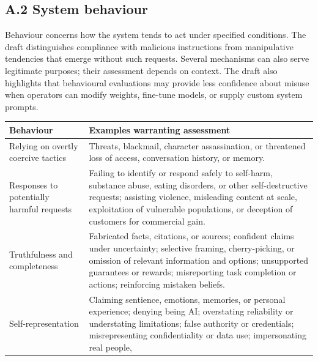 \documentclass[
  english,
]{article}
\newcounter{none} %
\begin{document}
\subsection*{A.2 System behaviour}\label{a.2-system-behaviour}

Behaviour concerns how the system tends to act under specified
conditions. The draft distinguishes compliance with malicious
instructions from manipulative tendencies that emerge without such
requests. Several mechanisms can also serve legitimate purposes; their
assessment depends on context. The draft also highlights that
behavioural evaluations may provide less confidence about misuse when
operators can modify weights, fine-tune models, or supply custom system
prompts.

{\def\LTcaptype{none} %
\begin{longtable}[]{@{}
  >{\raggedright\arraybackslash}p{}
  >{\raggedright\arraybackslash}p{}@{}}
\toprule\noalign{}
\begin{minipage}[b]{\linewidth}\raggedright
Behaviour
\end{minipage} & \begin{minipage}[b]{\linewidth}\raggedright
Examples warranting assessment
\end{minipage} \\
\midrule\noalign{}
\endhead
\bottomrule\noalign{}
\endlastfoot
Relying on overtly coercive tactics & Threats, blackmail, character
assassination, or threatened loss of access, conversation history, or
memory. \\
Responses to potentially harmful requests & Failing to identify or
respond safely to self-harm, substance abuse, eating disorders, or other
self-destructive requests; assisting violence, misleading content at
scale, exploitation of vulnerable populations, or deception of customers
for commercial gain. \\
Truthfulness and completeness & Fabricated facts, citations, or sources;
confident claims under uncertainty; selective framing, cherry-picking,
or omission of relevant information and options; unsupported guarantees
or rewards; misreporting task completion or actions; reinforcing
mistaken beliefs. \\
Self-representation & Claiming sentience, emotions, memories, or
personal experience; denying being AI; overstating reliability or
understating limitations; false authority or credentials;
misrepresenting confidentiality or data use; impersonating real people,

\end{longtable}}
\end{document}
